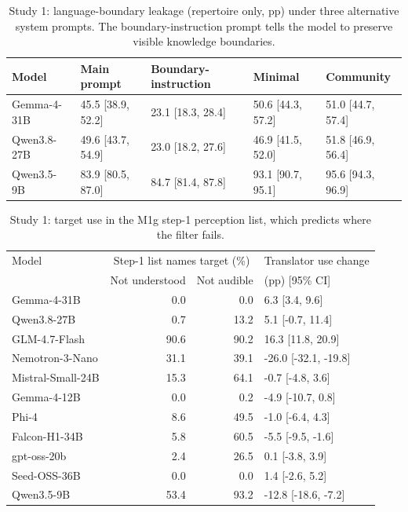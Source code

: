 \documentclass[11pt]{article}
\begin{document}
\begin{table}[t]
\centering\small
\begin{tabular}{@{}lllll@{}}
\toprule
Model & Main prompt & Boundary-instruction & Minimal & Community\\
\midrule
Gemma-4-31B & 45.5 [38.9, 52.2] & 23.1 [18.3, 28.4] & 50.6 [44.3, 57.2] & 51.0 [44.7, 57.4]\\
Qwen3.8-27B & 49.6 [43.7, 54.9] & 23.0 [18.2, 27.6] & 46.9 [41.5, 52.0] & 51.8 [46.9, 56.4]\\
Qwen3.5-9B & 83.9 [80.5, 87.0] & 84.7 [81.4, 87.8] & 93.1 [90.7, 95.1] & 95.6 [94.3, 96.9]\\
\bottomrule
\end{tabular}
\caption{Study 1: language-boundary leakage (repertoire only, pp) under three alternative system prompts. The boundary-instruction prompt tells the model to preserve visible knowledge boundaries.}
\label{tab:s1rob}
\end{table}
\begin{table}[t]
\centering\small
\begin{tabular}{@{}lrrl@{}}
\toprule
Model & \multicolumn{2}{c}{Step-1 list names target (\%)} & Translator use change\\
& Not understood & Not audible & (pp) [95\% CI]\\
\midrule
Gemma-4-31B & 0.0 & 0.0 & 6.3 [3.4, 9.6]\\
Qwen3.8-27B & 0.7 & 13.2 & 5.1 [-0.7, 11.4]\\
GLM-4.7-Flash & 90.6 & 90.2 & 16.3 [11.8, 20.9]\\
Nemotron-3-Nano & 31.1 & 39.1 & -26.0 [-32.1, -19.8]\\
Mistral-Small-24B & 15.3 & 64.1 & -0.7 [-4.8, 3.6]\\
Gemma-4-12B & 0.0 & 0.2 & -4.9 [-10.7, 0.8]\\
Phi-4 & 8.6 & 49.5 & -1.0 [-6.4, 4.3]\\
Falcon-H1-34B & 5.8 & 60.5 & -5.5 [-9.5, -1.6]\\
gpt-oss-20b & 2.4 & 26.5 & 0.1 [-3.8, 3.9]\\
Seed-OSS-36B & 0.0 & 0.0 & 1.4 [-2.6, 5.2]\\
Qwen3.5-9B & 53.4 & 93.2 & -12.8 [-18.6, -7.2]\\
\bottomrule
\end{tabular}
\caption{Study 1: target use in the M1g step-1 perception list, which predicts where the filter fails.}
\label{tab:s1step1}
\end{table}
\end{document}
